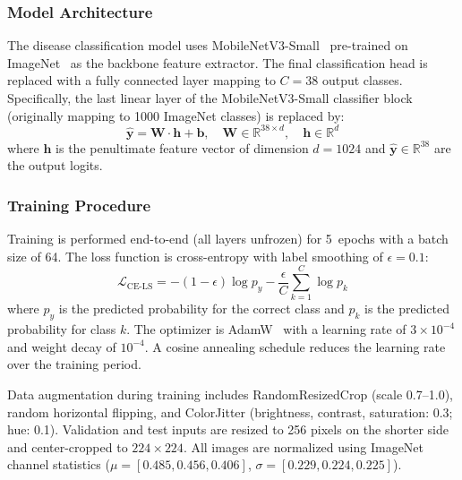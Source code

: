 \documentclass[conference]{IEEEtran}
\begin{document}
\subsubsection{Model Architecture}
The disease classification model uses MobileNetV3-Small~\cite{howard2019searching} pre-trained on ImageNet~\cite{deng2009imagenet} as the backbone feature extractor. The final classification head is replaced with a fully connected layer mapping to $C = 38$ output classes. Specifically, the last linear layer of the MobileNetV3-Small classifier block (originally mapping to 1000 ImageNet classes) is replaced by:
\begin{equation}
  \hat{\mathbf{y}} = \mathbf{W} \cdot \mathbf{h} + \mathbf{b}, \quad \mathbf{W} \in \mathbb{R}^{38 \times d}, \quad \mathbf{h} \in \mathbb{R}^{d}
\end{equation}
where $\mathbf{h}$ is the penultimate feature vector of dimension $d = 1024$ and $\hat{\mathbf{y}} \in \mathbb{R}^{38}$ are the output logits.

\subsubsection{Training Procedure}
Training is performed end-to-end (all layers unfrozen) for 5~epochs with a batch size of 64. The loss function is cross-entropy with label smoothing of $\epsilon = 0.1$:
\begin{equation}
  \mathcal{L}_{\text{CE-LS}} = -(1 - \epsilon) \log p_{y} - \frac{\epsilon}{C} \sum_{k=1}^{C} \log p_{k}
\end{equation}
where $p_{y}$ is the predicted probability for the correct class and $p_{k}$ is the predicted probability for class $k$. The optimizer is AdamW~\cite{loshchilov2019decoupled} with a learning rate of $3 \times 10^{-4}$ and weight decay of $10^{-4}$. A cosine annealing schedule reduces the learning rate over the training period.

Data augmentation during training includes RandomResizedCrop (scale 0.7--1.0), random horizontal flipping, and ColorJitter (brightness, contrast, saturation: 0.3; hue: 0.1). Validation and test inputs are resized to 256 pixels on the shorter side and center-cropped to $224 \times 224$. All images are normalized using ImageNet channel statistics ($\mu = [0.485, 0.456, 0.406]$, $\sigma = [0.229, 0.224, 0.225]$).
\end{document}
